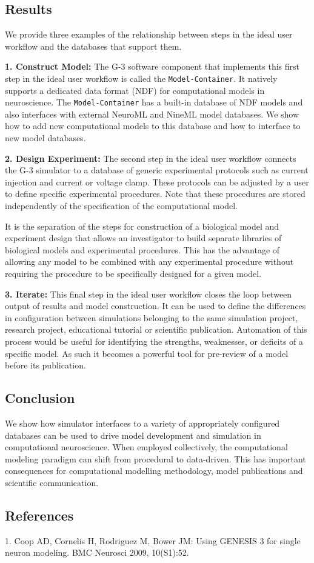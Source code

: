 \documentclass[12pt]{article}
\begin{document}
\subsection*{Results}

We provide three examples of the relationship between steps in the ideal user workflow and the databases that support them.

{\bf 1. Construct Model:} The G-3 software component that implements this first step in the ideal
user workflow is called the {\tt Model-Container}.  It
natively supports a dedicated data format (NDF) for computational models in neuroscience.  The {\tt Model-Container} has a built-in database of NDF models and also interfaces with external NeuroML and NineML model databases.  We
show how to add new computational models to this database and how to interface to new model databases.

{\bf 2. Design Experiment:} The second step in the ideal user workflow connects the G-3 simulator
to a database of generic experimental protocols such as current injection and current or voltage
clamp.  These protocols can be adjusted by a user to define specific experimental procedures. 
Note that these procedures are stored independently of the specification
of the computational model.

It is the separation of the steps for construction of a biological model and
experiment design that allows an investigator to build separate libraries of
biological models and experimental procedures.  This has the advantage of
allowing any model to be combined with any experimental
procedure without requiring the procedure to be specifically designed for a given model.  

{\bf 3. Iterate:} This final step in the ideal user workflow closes the loop between output of results and model construction.
It can be used to define the differences in configuration between simulations belonging to the same simulation
project, research project, educational tutorial or scientific publication. Automation of this process would be
useful for identifying the strengths, weaknesses, or deficits of a specific model.  As such it becomes a powerful tool for pre-review of a model before its publication.

\subsection*{Conclusion}

We show how simulator interfaces to a variety of appropriately
configured databases can be used to drive model development and
simulation in computational neuroscience.  When employed collectively,
the computational modeling paradigm can shift from procedural to
data-driven.  This has important consequences for computational
modelling methodology, model publications and scientific
communication.


\subsection*{References}
1. Coop AD, Cornelis H, Rodriguez M, Bower JM: Using GENESIS 3 for single neuron modeling. BMC Neurosci 2009, 10(S1):52.
\end{document}
